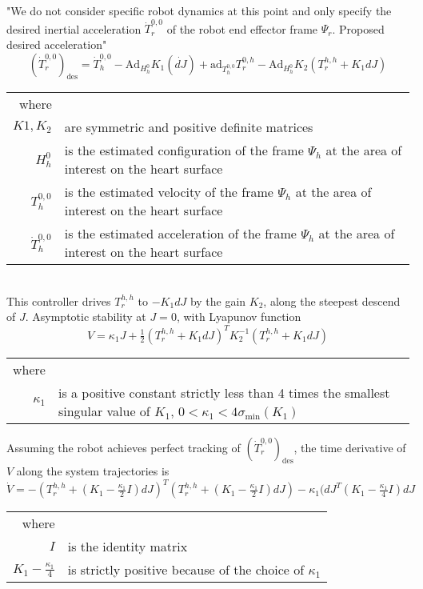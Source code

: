 "We do not consider specific robot dynamics at this point and only specify the desired inertial acceleration $\dot{T}^{0,0}_r$ of the robot end effector frame $\Psi_r$. Proposed desired acceleration"
\begin{equation}
\left(\dot{T}^{0,0}_r\right)_\text{des} = \dot{T}^{0,0}_h - \text{Ad}_{H^0_h} K_1 (\dot{dJ}) + \text{ad}_{T^{0,0}_h} T^{0,h}_r - \text{Ad}_{H^0_h} K_2 (T^{h,h}_r + K_1 dJ)
\end{equation}
\begin{tabular}{rl}
	where & \\
	$K1, K_2$ & are symmetric and positive definite matrices\\
	$H^0_h$ & is the estimated configuration of the frame $\Psi_h$ at the area of interest on the heart surface\\
	$T^{0,0}_h$ & is the estimated velocity of the frame $\Psi_h$ at the area of interest on the heart surface\\
	$\dot{T}^{0,0}_h$ & is the estimated acceleration of the frame $\Psi_h$ at the area of interest on the heart surface\\
\end{tabular}\\

This controller drives $T^{h,h}_r$ to $-K_1dJ$ by the gain $K_2$, along the steepest descend of $J$. Asymptotic stability at $J=0$, with Lyapunov function
\begin{equation}
V=\kappa_1 J + \tfrac{1}{2} (T^{h,h}_r + K_1dJ)^T K_2^{-1}(T^{h,h}_r + K_1dJ)
\end{equation}
\begin{tabular}{rl}
	where & \\
	$\kappa_1$ & is a positive constant strictly less than 4 times the smallest singular value of $K_1$, $0<\kappa_1 <4\sigma_\text{min}(K_1)$
\end{tabular}

Assuming the robot achieves perfect tracking of $\left(\dot{T}^{0,0}_r\right)_\text{des}$, the time derivative of $V$ along the system trajectories is
\begin{equation}
\dot{V} = -\left(T^{h,h}_r + (K_1 - \tfrac{\kappa_1}{2}I)dJ\right)^T \left(T^{h,h}_r + (K_1 - \tfrac{\kappa_1}{2}I)dJ\right) - \kappa_1(dJ ^T(K_1 - \tfrac{\kappa_1}{4}I)dJ
\end{equation}
\begin{tabular}{rl}
	where & \\
	$I$ & is the identity matrix\\
	$K_1 - \tfrac{\kappa_1}{4}$ & is strictly positive because of the choice of $\kappa_1$\\
\end{tabular}